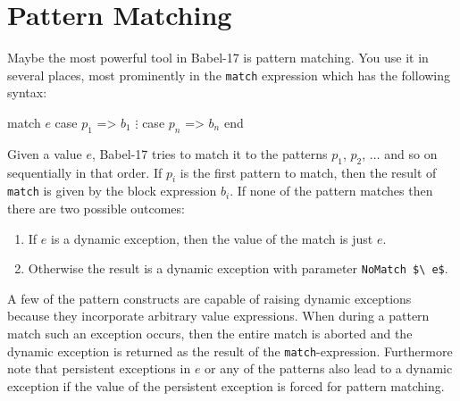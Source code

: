 \documentclass[11pt]{amsart}
\newcommand{\babelsrc}[1] {\lstinline!#1!}
\begin{document}
\section{Pattern Matching}
Maybe the most powerful tool in Babel-17 is pattern matching. You use it in several places, most prominently in the \babelsrc{match} expression which has the following syntax:
\begin{babellisting}
match $e$ 
  case $p_1$ => $b_1$
  $\vdots$
  case $p_n$ => $b_n$
end  
\end{babellisting}
Given a value $e$, Babel-17 tries to match it to the patterns $p_1$, $p_2$, $\ldots$ and so on sequentially in that order. If $p_i$ is the first pattern to match, then the result of \babelsrc{match} 
is given by the block expression $b_i$. If none of the pattern matches then there are two possible outcomes:
\begin{enumerate}
\item If $e$ is a dynamic exception, then the value of the match is just $e$.
\item Otherwise the result is a dynamic exception with parameter \babelsrc{NoMatch $\ e$}.
\end{enumerate}
A few of the pattern constructs are capable of raising dynamic exceptions because they incorporate arbitrary value expressions. When during a pattern match such an exception occurs, then the entire match is aborted and the dynamic exception is returned as the result of the \babelsrc{match}-expression. Furthermore note that persistent exceptions in $e$ or any of the patterns also lead to a dynamic exception if the value of the persistent exception is forced for pattern matching.
\end{document}
